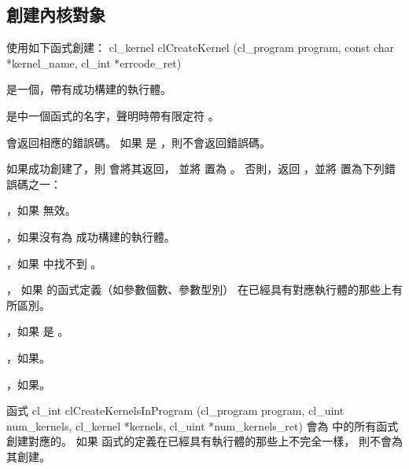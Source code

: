 \subsection{創建內核對象}

使用如下函式創建：
\startCLFUNC
cl_kernel clCreateKernel (cl_program program,
			const char *kernel_name,
			cl_int *errcode_ret)
\stopCLFUNC

 是一個，帶有成功構建的執行體。

 是中一個函式的名字，聲明時帶有限定符 。

 會返回相應的錯誤碼。
如果  是 ，則不會返回錯誤碼。

如果成功創建了，則  會將其返回，
並將  置為 。
否則，返回 ，並將  置為下列錯誤碼之一：
\startigBase
\item {}，如果  無效。

\item {}，如果沒有為  成功構建的執行體。

\item {}，如果  中找不到 。

\item {}，
如果  的函式定義（如參數個數、參數型別）
在已經具有對應執行體的那些上有所區別。

\item {}，如果  是 。

\item {}，如果\scdevfailres。

\item {}，如果\schostfailres。
\stopigBase

函式
\startCLFUNC
cl_int clCreateKernelsInProgram (cl_program program,
			cl_uint num_kernels,
			cl_kernel *kernels,
			cl_uint *num_kernels_ret)
\stopCLFUNC
會為  中的所有函式創建對應的。
如果  函式的定義在已經具有執行體的那些上不完全一樣，
則不會為其創建。

